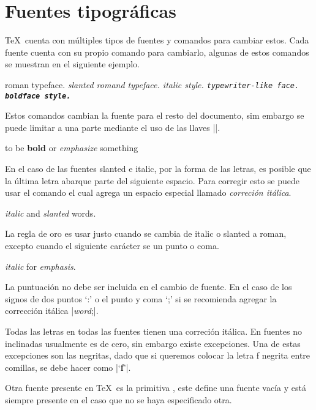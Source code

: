 \section{Fuentes tipográficas}

\TeX\ cuenta con múltiples tipos de fuentes y comandos para cambiar estos. 
Cada fuente cuenta con su propio comando para cambiarlo, algunas de estos comandos se muestran en el siguiente ejemplo.

\begin{texexample}
  \rm roman typeface.
  \sl slanted romand typeface.
  \it italic style.
  \tt typewriter-like face.
  \bf boldface style.
\end{texexample}

Estos comandos cambian la fuente para el resto del documento, sim embargo se puede limitar a una parte mediante el uso de las llaves \texline|{}|.

\begin{texexample}
  to be {\bf bold} or {\sl emphasize} something
\end{texexample}

En el caso de las fuentes slanted e italic, por la forma de las letras, es posible que la última letra abarque parte del siguiente espacio. Para corregir esto se puede usar el comando \texcs\/ el cual agrega un espacio especial llamado \emph{correción itálica}.

\begin{texexample}
  {\it italic\/} and {\sl slanted\/} words.
\end{texexample}

La regla de oro es usar \texcs\/ justo cuando se cambia de italic o slanted a roman, excepto cuando el siguiente carácter se un punto o coma.

\begin{texexample}
  {\it italic\/} for {\it emphasis}.
\end{texexample}

La puntuación no debe ser incluida en el cambio de fuente. En el caso de los signos de dos puntos `:' o el punto y coma `;' si se recomienda agregar la corrección itálica \texline|{\it word\/};|.

Todas las letras en todas las fuentes tienen una correción itálica. En fuentes no inclinadas usualmente es de cero, sin embargo existe excepciones. Una de estas excepciones son las negritas, dado que si queremos colocar la letra f negrita entre comillas, se debe hacer como \texline|`{\bf f\/}'|.

Otra fuente presente en \TeX\ es la primitiva \texcs\nullfont, este define una fuente vacía y está siempre presente en el caso que no se haya especificado otra.

